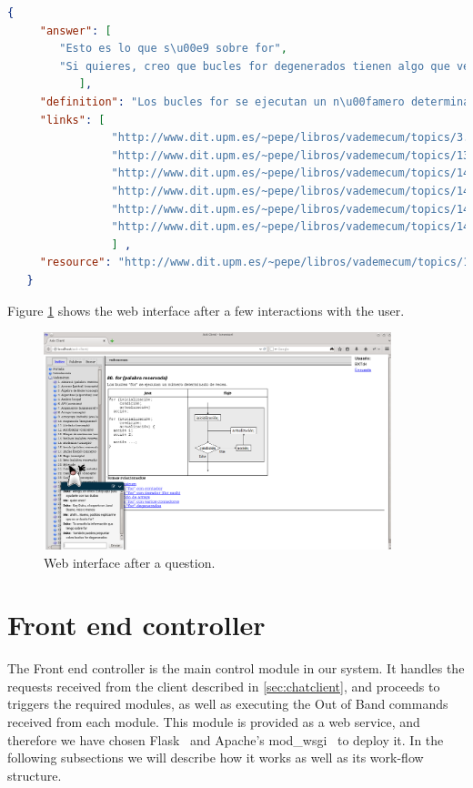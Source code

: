 \begin{center} 
  \begin{lstlisting}[language=json, caption=Example response for the chat client, label=listing:jsonchatresponse]
   {
     "answer": [
		"Esto es lo que s\u00e9 sobre for",
		"Si quieres, creo que bucles for degenerados tienen algo que ver con esto"
	       ],
     "definition": "Los bucles for se ejecutan un n\u00famero determinado de veces",
     "links": [
                "http://www.dit.upm.es/~pepe/libros/vademecum/topics/3.html",
                "http://www.dit.upm.es/~pepe/libros/vademecum/topics/139.html",
                "http://www.dit.upm.es/~pepe/libros/vademecum/topics/140.html",
                "http://www.dit.upm.es/~pepe/libros/vademecum/topics/141.html",
                "http://www.dit.upm.es/~pepe/libros/vademecum/topics/142.html",
                "http://www.dit.upm.es/~pepe/libros/vademecum/topics/143.html"
                ] ,
     "resource": "http://www.dit.upm.es/~pepe/libros/vademecum/topics/138.html"
   }  
  \end{lstlisting}
\end{center}

Figure \ref{fig:chat2} shows the web interface after a few interactions with the user.

\begin{figure}[!htbp]
    \centering
    \includegraphics[width=0.9\textwidth]{img/screens/ask-client-asked.png}
    \caption{Web interface after a question.}
    \label{fig:chat2}
\end{figure}

\section{Front end controller}
\label{sec:frontendcon}
The Front end controller is the main control module in our system. It handles the requests received from the client described in \ref{sec:chatclient}, and proceeds to triggers the required modules, as well as executing the Out of Band commands received from each module. This module is provided as a web service, and therefore we have chosen Flask~\cite{flask0101} and Apache's mod\_wsgi~\cite{modwsgi} to deploy it. In the following subsections we will describe how it works as well as its work-flow structure.

